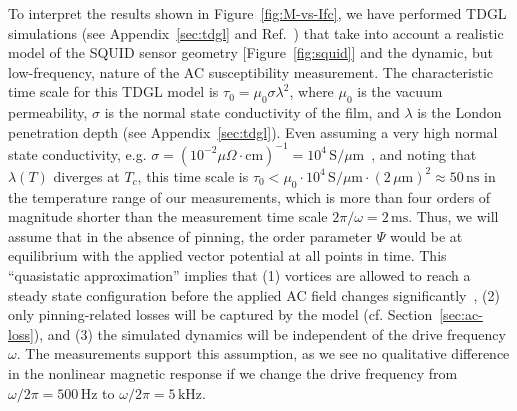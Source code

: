 \documentclass[%
 reprint,
 superscriptaddress,
 amsmath,
 amssymb,
 amsfonts,
 aps,
 prb,
]{revtex4-2}
\newcommand{\Tc}{T_c}
\newcommand{\um}{\mu\mathrm{m}}
\begin{document}

To interpret the results shown in Figure~\ref{fig:M-vs-Ifc}, we have performed TDGL simulations (see Appendix~\ref{sec:tdgl} and Ref.~\cite{Bishop-Van_Horn2023-dm}) that take into account a realistic model of the SQUID sensor geometry [Figure~\ref{fig:squid}] and the dynamic, but low-frequency, nature of the AC susceptibility measurement. The characteristic time scale for this TDGL model is $\tau_0=\mu_0\sigma\lambda^2$, where $\mu_0$ is the vacuum permeability, $\sigma$ is the normal state conductivity of the film, and $\lambda$ is the London penetration depth (see Appendix~\ref{sec:tdgl}). Even assuming a very high normal state conductivity, e.g. $\sigma=(10^{-2}\mu\Omega\cdot\mathrm{cm})^{-1}=10^4\,\mathrm{S}/\um$~\cite{Webb1969-mb}, and noting that $\lambda(T)$ diverges at $\Tc$, this time scale is $\tau_0<\mu_0\cdot10^4\,\mathrm{S}/\um\cdot(2\,\um)^2\approx50\,\mathrm{ns}$ in the temperature range of our measurements, which is more than four orders of magnitude shorter than the measurement time scale $2\pi/\omega=2\,\mathrm{ms}$. Thus, we will assume that in the absence of pinning, the order parameter $\Psi$ would be at equilibrium with the applied vector potential at all points in time. This ``quasistatic approximation'' implies that (1) vortices are allowed to reach a steady state configuration before the applied AC field changes significantly~\cite{Lemberger2016-pb}, (2) only pinning-related losses will be captured by the model (cf. Section~\ref{sec:ac-loss}), and (3) the simulated dynamics will be independent of the drive frequency $\omega$. The measurements support this assumption, as we see no qualitative difference in the nonlinear magnetic response if we change the drive frequency from $\omega/2\pi=500\,\mathrm{Hz}$ to $\omega/2\pi=5\,\mathrm{kHz}$.
\end{document}

